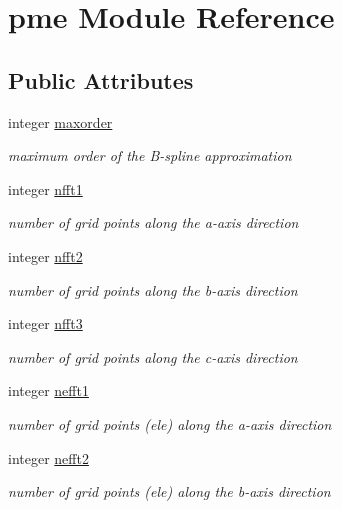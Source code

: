 \hypertarget{classpme}{\section{pme Module Reference}
\label{classpme}
}
\subsection*{Public Attributes}
\begin{DoxyCompactItemize}
\item 
integer \hyperlink{classpme_a52bd2839e2a18ce15733259a32c2bc3f}{maxorder}
\begin{DoxyCompactList}\small\item\em maximum order of the B-\/spline approximation \end{DoxyCompactList}\item 
integer \hyperlink{classpme_a1bd77907007725e4328b4ab7cae55b17}{nfft1}
\begin{DoxyCompactList}\small\item\em number of grid points along the a-\/axis direction \end{DoxyCompactList}\item 
integer \hyperlink{classpme_aee11b314910706a89f58d6fb117898be}{nfft2}
\begin{DoxyCompactList}\small\item\em number of grid points along the b-\/axis direction \end{DoxyCompactList}\item 
integer \hyperlink{classpme_a8c9bd1d93a04978d16457ee89f7251e8}{nfft3}
\begin{DoxyCompactList}\small\item\em number of grid points along the c-\/axis direction \end{DoxyCompactList}\item 
integer \hyperlink{classpme_a05ad6177dd8e91c37251408d2a71560c}{nefft1}
\begin{DoxyCompactList}\small\item\em number of grid points (ele) along the a-\/axis direction \end{DoxyCompactList}\item 
integer \hyperlink{classpme_a53bdcfb369bad0a725232ec54866515e}{nefft2}
\begin{DoxyCompactList}\small\item\em number of grid points (ele) along the b-\/axis direction \end{DoxyCompactList}\item 

\end{DoxyCompactItemize}
